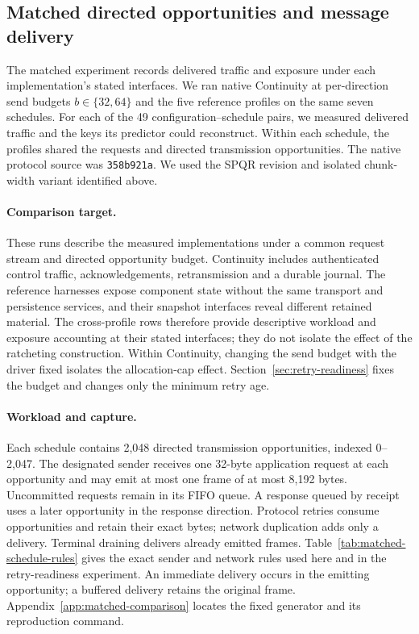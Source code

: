 \subsection{Matched directed opportunities and message delivery}
\label{sec:matched-opportunities}

The matched experiment records delivered traffic and exposure under each
implementation's stated interfaces. We ran native Continuity at
per-direction send budgets $b\in\{32,64\}$ and the five reference
profiles on the same seven schedules. For each of the 49
configuration--schedule pairs, we measured delivered traffic and the keys
its predictor could reconstruct. Within each schedule, the profiles shared
the requests and directed transmission opportunities. The native protocol
source was \texttt{358b921a}.
We used the SPQR revision and isolated chunk-width variant identified above.

\paragraph{Comparison target.}
These runs describe the measured implementations under a common request
stream and directed opportunity budget. Continuity includes authenticated
control traffic, acknowledgements, retransmission and a durable journal.
The reference harnesses expose component state without the same transport
and persistence services, and their snapshot interfaces reveal different
retained material. The cross-profile rows therefore provide descriptive
workload and exposure accounting at their stated interfaces; they do not
isolate the effect of the ratcheting construction. Within Continuity,
changing the send budget with the driver fixed isolates the allocation-cap
effect. Section~\ref{sec:retry-readiness} fixes the budget and changes only
the minimum retry age.

\paragraph{Workload and capture.}
Each schedule contains 2,048 directed transmission opportunities, indexed
0--2,047. The designated sender receives one 32-byte application request at
each opportunity and may emit at most one frame of at most 8,192 bytes.
Uncommitted requests remain in its FIFO queue. A response queued by receipt
uses a later opportunity in the response direction. Protocol retries consume
opportunities and retain their exact bytes; network duplication adds only a
delivery. Terminal draining delivers already emitted frames.
Table~\ref{tab:matched-schedule-rules} gives the exact sender and network
rules used here and in the retry-readiness experiment. An immediate
delivery occurs in the emitting opportunity; a buffered delivery retains
the original frame. Appendix~\ref{app:matched-comparison} locates the
fixed generator and its reproduction command.

